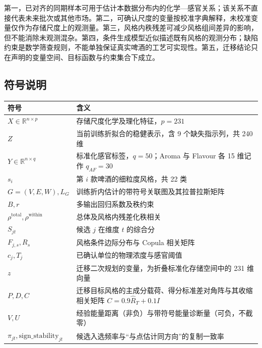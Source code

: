 \documentclass[11pt,a4paper]{article}
\begin{document}
第一，已对齐的同期样本可用于估计本数据分布内的化学---感官关系；该关系不直接代表未来批次或其他市场。第二，可确认尺度的变量按校准字典解释，未校准变量仅作为存储尺度上的观测量。第三，风格内秩残差可减少风格组间差异的影响，但不能消除未观测混杂。第四，条件生成模型近似描述既有风格的观测分布；缺陷约束是数学筛查规则，不能单独保证真实啤酒的工艺可实现性。第五，迁移结论只在声明的变量空间、目标函数与约束集合下成立。

\subsection{符号说明}\label{ux7b26ux53f7ux8bf4ux660e}

{
\begin{longtable}[]{@{}
  >{\raggedright\arraybackslash}p{}
  >{\raggedright\arraybackslash}p{}@{}}
\toprule\noalign{}
\begin{minipage}[b]{\linewidth}\raggedright
符号
\end{minipage} & \begin{minipage}[b]{\linewidth}\raggedright
含义
\end{minipage} \\
\midrule\noalign{}
\endhead
\bottomrule\noalign{}
\endlastfoot
\(X\in\mathbb R^{n\times p}\) & 存储尺度化学及理化特征，\(p=231\) \\
\(Z\) & 当前训练折拟合的稳健表示，含 9 个缺失指示列，共 240 维 \\
\(Y\in\mathbb R^{n\times q}\) & 标准化感官标签，\(q=50\)；Aroma 与
Flavour 各 15 维记作 \(q_{AF}=30\) \\
\(s_i\) & 第 \(i\) 款啤酒的细粒度风格，共 22 类 \\
\(G=(V,E,W),L_G\) & 训练折内估计的带符号关联图及其拉普拉斯矩阵 \\
\(B,r\) & 多输出回归系数及秩约束 \\
\(\rho^{\mathrm{total}},\rho^{\mathrm{within}}\) &
总体及风格内残差化秩相关 \\
\(S_{jt}\) & 候选 \(j\) 在维度 \(t\) 的综合分 \\
\(F_{j,s},R_s\) & 风格条件边际分布与 Copula 相关矩阵 \\
\(c_j,T_j\) & 已确认单位的物理浓度与感官阈值 \\
\(z\) & 迁移二次规划的变量，为折叠标准化存储空间中的 231 维向量 \\
\(P,D,C\) & 迁移目标风格的主成分载荷、得分标准差对角阵与其收缩相关矩阵
\(C=0.9\widehat R_T+0.1I\) \\
\(V,U\) & 经验能量距离（非负）与带符号能量诊断量（可负，不截零） \\
\(\pi_{jt},\text{sign\_stability}_{jt}\) &
候选入选频率与``与点估计同方向''的复制一致率 \\
\end{longtable}
}
\end{document}
